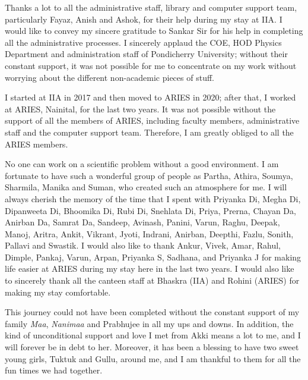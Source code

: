Thanks a lot to all the administrative staff, library and computer support team, particularly Fayaz, Anish and Ashok, for their help during my stay at IIA. I would like to convey my sincere gratitude to Sankar Sir for his help in completing all the administrative processes. 
I sincerely applaud the COE, HOD Physics Department and administration staff of Pondicherry University; without their constant support, it was not possible for me to concentrate on my work without worrying about the different non-academic pieces of stuff. 

I started at IIA in 2017 and then moved to ARIES in 2020; after that, I worked at ARIES, Nainital, for the last two years. It was not possible without the support of all the members of ARIES, including faculty members, administrative staff and the computer support team. Therefore, I am greatly obliged to all the ARIES members.

No one can work on a scientific problem without a good environment. I am fortunate to have such a wonderful group of people as Partha, Athira, Soumya, Sharmila, Manika and Suman, who created such an atmosphere for me. I will always cherish the memory of the time that I spent with Priyanka Di, Megha Di, Dipanweeta Di, Bhoomika Di, Rubi Di, Snehlata Di, Priya, Prerna, Chayan Da, Anirban Da, Samrat Da, Sandeep, Avinash, Panini, Varun, Raghu, Deepak, Manoj, Aritra, Ankit, Vikrant, Jyoti, Indrani, Anirban, Deepthi, Fazlu, Sonith, Pallavi and Swastik. I would also like to thank Ankur, Vivek, Amar, Rahul, Dimple, Pankaj, Varun, Arpan, Priyanka S, Sadhana, and Priyanka J for making life easier at ARIES during my stay here in the last two years. I would also like to sincerely thank all the canteen staff at Bhaskra (IIA) and Rohini (ARIES) for making my stay comfortable.

This journey could not have been completed without the constant support of my family {\it Maa}, {\it Nanimaa} and Prabhujee in all my ups and downs. In addition, the kind of unconditional support and love I met from Akki means a lot to me, and I will forever be in debt to her. Moreover, it has been a blessing to have two sweet young girls, Tuktuk and Gullu, around me, and I am thankful to them for all the fun times we had together.


\pagestyle{empty}